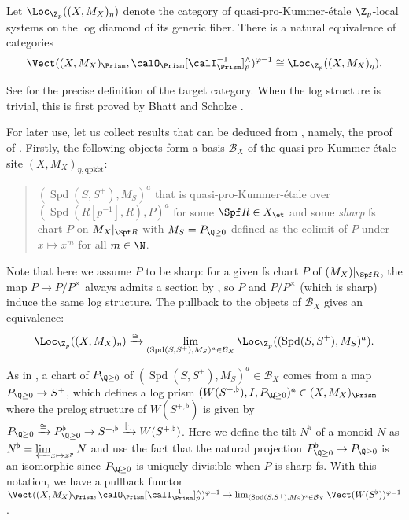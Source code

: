 \begin{thm} \label{thm:logetalerealizationofLaurentFcrystals}
Let $\Loc_{\Z_p}((X,M_X)_\eta)$ denote the category of quasi-pro-Kummer-\'etale $\Z_p$-local systems on the log diamond of its generic fiber.
There is a natural equivalence of categories
\[
\Vect((X,M_X)_\Prism,\calO_\Prism[\calI_\Prism^{-1}]^\wedge_p)^{\varphi=1}\cong \Loc_{\Z_p}((X,M_X)_\eta).
\]
\end{thm}

See \cite[\S7.5]{koshikawa-yao} for the precise definition of the target category. When the log structure is trivial, this is first proved by Bhatt and Scholze \cite[Cor.~3.8]{bhatt-scholze-prismaticFcrystal}.

\begin{rem}\label{rem:results from Koshikawa-Yao Thm 7.36}
For later use, let us collect results that can be deduced from \cite[Thm.~7.36, Pf.]{koshikawa-yao}, namely, the proof of \cite[Thm.~6]{koshikawa-yao}. Firstly, the following objects form a basis $\mathcal{B}_X$ of the quasi-pro-Kummer-\'etale site $(X,M_X)_{\eta,\mathrm{qpk\acute{e}t}}$:
\begin{quote}
    $(\operatorname{Spd}(S,S^+),M_S)^a$ that is quasi-pro-Kummer-\'etale over $(\operatorname{Spd}(R[p^{-1}],R),P)^a$ for some $\Spf R\in X_\et$ and some \emph{sharp} fs chart $P$ on $M_X|_{\Spf R}$ with $M_S=P_{\Q\geq 0}$ defined as the colimit of $P$ under $x\mapsto x^m$ for all $m 
    \in \N$.
\end{quote}
Note that here we assume $P$ to be sharp: for a given fs chart $P$ of $(M_X)|_{\Spf R}$, the map  $P \to P/P^\times$ always admits a section by \cite[Prop.~I.1.3.5]{Ogus-log}, so $P$ and $P/P^\times$ (which is sharp)  induce the same log structure. The pullback to the objects of $\mathcal{B}_X$ gives an equivalence:
\begin{equation*} 
\Loc_{\Z_p}((X,M_X)_\eta) \xrightarrow{\cong}\lim_{(\operatorname{Spd}(S,S^+), M_S)^a \in \mathcal{B}_X} \Loc_{\Z_p}((\operatorname{Spd}(S,S^+), M_S)^a). 
\end{equation*}

As in \cite[Def.~7.4]{koshikawa-yao}, a chart of $P_{\Q\geq 0}$ of $(\operatorname{Spd}(S,S^+),M_S)^a\in \mathcal{B}_X$ comes from a map $P_{\Q\geq 0} \to S^+$, which defines a log prism $(W(S^{+,\flat}),I,P_{\Q\geq 0})^a\in (X,M_X)_\Prism$ where the prelog structure of $W(S^{+,\flat})$ is given by $P_{\Q\geq 0}\xrightarrow{\cong} P_{\Q\geq 0}^\flat \to S^{+,\flat} \xrightarrow{[\cdot]} W(S^{+,\flat})$. Here we define the tilt $N^\flat$ of a monoid $N$ as $N^\flat=\varprojlim_{x\mapsto x^p} N$ and use the fact that the natural projection $P_{\Q\geq 0}^\flat \to P_{\Q\geq 0}$ is an isomorphic since 
$P_{\Q\geq 0}$ is uniquely divisible when $P$ is sharp fs. With this notation, we have a pullback functor $\Vect((X,M_X)_\Prism,\calO_\Prism[\calI_\Prism^{-1}]^\wedge_p)^{\varphi=1} \rightarrow \lim_{(\operatorname{Spd}(S,S^+), M_S)^a \in \mathcal{B}_X} \Vect(W(S^{\flat}))^{\varphi = 1}$.


\end{rem}
